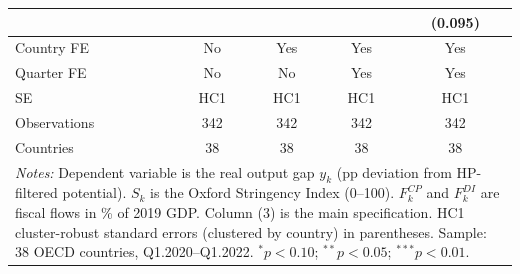 \documentclass[12pt, a4paper]{article}
\begin{document}
\begin{table}[htbp]
\begin{tabular}{lcccc}
  &                &                &                & (0.095)        \\[4pt]
\midrule
Country FE       & No  & Yes & Yes & Yes \\
Quarter FE       & No  & No  & Yes & Yes \\
SE               & HC1 & HC1 & HC1 & HC1 \\
Observations     & 342 & 342 & 342 & 342 \\
Countries        & 38  & 38  & 38  & 38  \\
\bottomrule
\multicolumn{5}{p{12cm}}{\footnotesize \textit{Notes:} Dependent variable is the real output gap $y_k$ (pp deviation from HP-filtered potential). $S_k$ is the Oxford Stringency Index (0--100). $F^{CP}_k$ and $F^{DI}_k$ are fiscal flows in \% of 2019 GDP. Column (3) is the main specification. HC1 cluster-robust standard errors (clustered by country) in parentheses. Sample: 38 OECD countries, Q1.2020--Q1.2022. $^{*}p<0.10$; $^{**}p<0.05$; $^{***}p<0.01$.} \\
\end{tabular}
\end{table}
\end{document}
